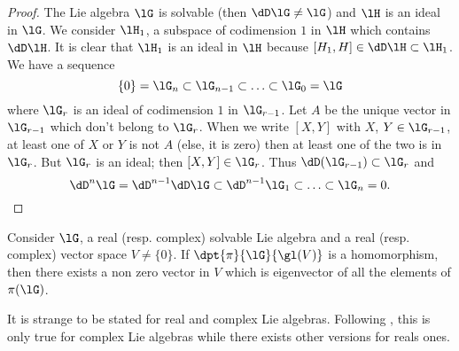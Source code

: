 \begin{proof}
The Lie algebra $\lG$ is solvable (then $\dD\lG\neq\lG$) and $\lH$ is an ideal in $\lG$. We consider $\lH_1$, a subspace of codimension $1$ in $\lH$ which contains $\dD\lH$. It is clear that $\lH_1$ is an ideal in $\lH$ because $[H_1,H]\in\dD\lH\subset\lH_1$.
We have a sequence
\begin{equation}\label{eq:solvable_chaine}
   \{0\}=\lG_n\subset\lG_{n-1}\subset\ldots\subset\lG_0=\lG
\end{equation}
where $\lG_r$ is an ideal of codimension $1$ in $\lG_{r-1}$. Let $A$ be the unique vector in $\lG_{r-1}$ which don't belong to $\lG_r$.  When we write $[X,Y]$ with $X$, $Y\in\lG_{r-1}$, at least one of $X$ or $Y$ is not $A$ (else, it is zero) then at least one of the two is in $\lG_r$. But $\lG_r$ is an ideal; then $[X,Y]\in\lG_r$. Thus $\dD(\lG_{r-1})\subset\lG_r$ and
\[
\dD^n\lG=\dD^{n-1}\dD\lG\subset\dD^{n-1}\lG_1\subset\ldots\subset\lG_n=0.
\]
\end{proof}

\begin{theorem}\label{tho:Lie_Vu}
    Consider $\lG$, a real (resp. complex) solvable Lie algebra and a real (resp. complex) vector space $V\neq\{0\}$. If $\dpt{\pi}{\lG}{\gl(V)}$ is a homomorphism, then there exists a non zero vector in $V$ which is eigenvector of all the elements of $\pi(\lG)$.
\end{theorem}

\begin{probleme}
    It is strange to be stated for real and complex Lie algebras. Following \cite{SamelsonNotesLieAlg}, this is only true for complex Lie algebras while there exists other versions for reals ones.
\end{probleme}

